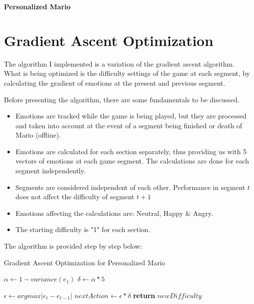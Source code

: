 \documentclass[11pt]{article}
\begin{document}
\begin{center}
\textbf{Personalized Mario}

\end{center}



\section{Gradient Ascent Optimization}
The algorithm I implemented is a variation of the gradient ascent algorithm.  
What is being optimized is the difficulty settings of the game at each segment, by calculating the gradient of emotions at the present and previous segment. 

Before presenting the algorithm, there are some fundamentals to be discussed. 

\begin{itemize}


\item Emotions are tracked while the game is being played, but they are processed and taken into account at the event of a segment being finished or death of Mario (offline).
\item Emotions are calculated for each section separately, thus providing us with 5 vectors of emotions at each game segment. The calculations are done for each segment independently. 
\item Segments are considered independent of each other. Performance in segment $t$ does not affect the difficulty of segment $t+1$
\item Emotions affecting the calculations are: Neutral, Happy \& Angry.
\item The starting difficulty is "1" for each section.
\end{itemize}

The algorithm is provided step by step below: 


\begin{algorithm}
\caption{Gradient Ascent Optimization for Personalized Mario}\label{euclid}
\begin{algorithmic}[1]

   \State $\alpha\gets 1-variance(e_1)$
   \State $\delta \gets \alpha*5$

      \State $\epsilon\gets argmax|e_t-e_{t-1}|$ 
      \State $nextAction\gets\epsilon*\delta$
      \EndIf
      \State \textbf{return} $newDifficulty$
   \EndFor
   
\EndProcedure
\end{algorithmic}
\end{algorithm}
\end{document}
